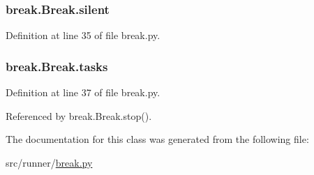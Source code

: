\hypertarget{classbreak_1_1Break_a4201e7e9673c801409adb8b7ea585609}{}
\subsubsection[{silent}]{\setlength{\rightskip}{0pt plus 5cm}break.\+Break.\+silent}\label{classbreak_1_1Break_a4201e7e9673c801409adb8b7ea585609}


Definition at line 35 of file break.\+py.

\hypertarget{classbreak_1_1Break_a9be1a4dbde4424b780ffbd7f38575ec8}{}
\subsubsection[{tasks}]{\setlength{\rightskip}{0pt plus 5cm}break.\+Break.\+tasks}\label{classbreak_1_1Break_a9be1a4dbde4424b780ffbd7f38575ec8}


Definition at line 37 of file break.\+py.



Referenced by break.\+Break.\+stop().



The documentation for this class was generated from the following file\+:\begin{DoxyCompactItemize}
\item 
src/runner/\hyperlink{break_8py}{break.\+py}\end{DoxyCompactItemize}
